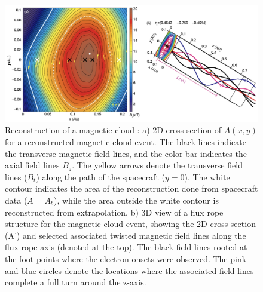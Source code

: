 \begin{figure}[ht!]
    \centering
    \includegraphics[width=\textwidth]{Figures/Reconstructions/Hu2015_GSreconstruction.png}
    \caption[GS 2D reconstruction of a magnetic cloud]{Reconstruction of a magnetic cloud \citep{Hu:2015}: a) 2D cross section of $A(x,y)$ for a reconstructed magnetic cloud event. The black lines indicate the transverse magnetic field lines, and the color bar indicates the axial field lines $B_z$. The yellow arrows denote the transverse field lines ($B_t$) along the path of the spacecraft ($y=0$). The white contour indicates the area of the reconstruction done from spacecraft data ($A=A_b$), while the area outside the white contour is reconstructed from extrapolation. b) 3D view of a flux rope structure for the magnetic cloud event, showing the 2D cross section (A') and selected associated twisted magnetic field lines along the flux rope axis (denoted at the top). The black field lines  rooted at the foot points where the electron onsets were observed. The pink and blue circles denote the locations where the associated field lines complete a full turn around the z-axis.}
    \label{fig:GSreconstruction_Hu2015}
\end{figure}


